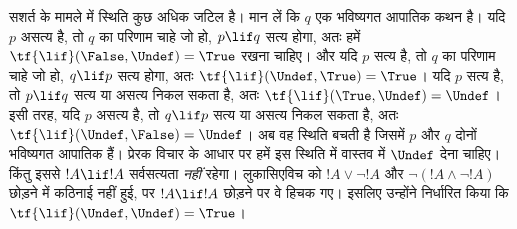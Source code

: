 \documentclass[../../../include/open-logic-section]{subfiles}
\begin{document}
सशर्त के मामले में स्थिति कुछ अधिक जटिल है। मान लें कि $q$ एक भविष्यगत
आपातिक कथन है। यदि $p$ असत्य है, तो $q$ का परिणाम चाहे जो हो, $p \lif q$
सत्य होगा, अतः हमें $\tf{\lif}(\False, \Undef) = \True$ रखना चाहिए। और यदि
$p$ सत्य है, तो $q$ का परिणाम चाहे जो हो, $q \lif p$ सत्य होगा, अतः
$\tf{\lif}(\Undef, \True) = \True$। यदि $p$ सत्य है, तो $p \lif q$ सत्य
या असत्य निकल सकता है, अतः $\tf{\lif}(\True, \Undef) = \Undef$। इसी तरह,
यदि $p$ असत्य है, तो $q \lif p$ सत्य या असत्य निकल सकता है, अतः
$\tf{\lif}(\Undef, \False) = \Undef$। अब वह स्थिति बचती है जिसमें $p$ और
$q$ दोनों भविष्यगत आपातिक हैं। प्रेरक विचार के आधार पर हमें इस स्थिति में
वास्तव में $\Undef$ देना चाहिए। किंतु इससे $!A \lif !A$ सर्वसत्यता
\emph{नहीं} रहेगा। लुकासिएविच को $!A \lor \lnot !A$ और
$\lnot(!A \land \lnot !A)$ छोड़ने में कठिनाई नहीं हुई, पर $!A \lif !A$
छोड़ने पर वे हिचक गए। इसलिए उन्होंने निर्धारित किया कि
$\tf{\lif}(\Undef, \Undef) = \True$।
\end{document}
